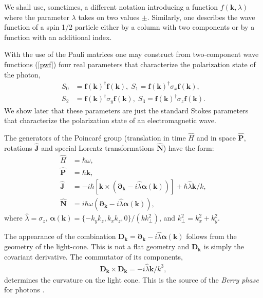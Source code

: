\documentclass[twocolumn,aps,pra,10pt]{revtex4-1}
\begin{document}
We shall use, sometimes, a different notation introducing a function $f({\bm k},\lambda)$ where the parameter $\lambda$ takes on two values $\pm$. Similarly, one describes the wave function of a spin 1/2 particle either by a column with two components or by a function with an additional index.

With the use of the Pauli matrices one may construct from two-component wave functions (\ref{pwf}) four real parameters that characterize the polarization state of the photon,
\begin{align}\label{stokes}
S_0&={\mathfrak{\bm{f}}({\bm k})}^\dagger{\mathfrak{\bm{f}}({\bm k})},\; S_1={\mathfrak{\bm{f}}({\bm k})}^\dagger\sigma_x{\mathfrak{\bm{f}}({\bm k})},\nonumber\\
S_2&={\mathfrak{\bm{f}}({\bm k})}^\dagger\sigma_y{\mathfrak{\bm{f}}({\bm k})},\; S_3={\mathfrak{\bm{f}}({\bm k})}^\dagger\sigma_z{\mathfrak{\bm{f}}({\bm k})}.
\end{align}
We show later that these parameters are just the standard Stokes parameters that characterize the polarization state of an electromagnetic wave.

The generators of the Poincar\'e group \cite{tom,qed} (translation in time ${\hat H}$ and in space ${\hat{\bm P}}$, rotations ${\hat{\bm J}}$ and special Lorentz transformations ${\hat{\bm N}}$) have the form:
\begin{align}
{\hat H}&=\hbar\omega,\label{en}\\
{\hat{\bm P}}&=\hbar{\bm k},\label{mom}\\
{\hat{\bm J}}&=-i\hbar\left[{\bm k}\times\left({\bm{\partial}_{\bm k}}-i{\hat{\lambda}}{\bm\alpha}({\bm k})\right)\right]+\hbar{\hat{\lambda}}{\bm k}/k,\label{angm}\\
{\hat{\bm N}}&=i\hbar\omega\left({{\bm{\partial}_{\bm k}}-i{\hat{\lambda}}{\bm\alpha}({\bm k})}\right),\label{boost}
\end{align}
where $\hat{\lambda}=\sigma_z$, $\bm\alpha(\bm k)=\{-k_yk_z,k_xk_z,0\}/(kk_\perp^2)$, and $k_\perp^2=k_x^2+k_y^2$.

The appearance of the combination ${\bm D}_{\bm k}={\bm{\partial}_{\bm k}}-i{\hat{\lambda}}{\bm\alpha}({\bm k})$ follows from the geometry of the light-cone. This is not a flat geometry and ${\bm D}_{\bm k}$ is simply the covariant derivative. The commutator of its components,
\begin{align}
{\bm D}_{\bm k}\times{\bm D}_{\bm k}= -i{\hat{\lambda}}{\bm k}/k^3,
\end{align}
determines the curvature on the light cone. This is the source of the {\em Berry phase} for photons  \cite{hols,berry}.
\end{document}
